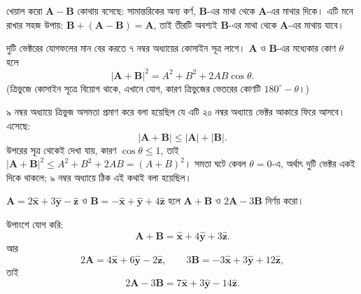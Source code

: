 \documentclass[11pt]{article}
\begin{document}
\begin{center}
\end{center}

খেয়াল করো $\mathbf{A}-\mathbf{B}$ কোথায় বসেছে: সামান্তরিকের অন্য কর্ণ,
$\mathbf{B}$-এর মাথা থেকে $\mathbf{A}$-এর মাথার দিকে। এটি মনে রাখার সহজ উপায়:
$\mathbf{B} + (\mathbf{A}-\mathbf{B}) = \mathbf{A}$, তাই তীরটি অবশ্যই
$\mathbf{B}$-এর মাথা থেকে $\mathbf{A}$-এর মাথায় যাবে।

দুটি ভেক্টরের যোগফলের মান বের করতে ৭ নম্বর অধ্যায়ের কোসাইন সূত্র লাগে।
$\mathbf{A}$ ও $\mathbf{B}$-এর মধ্যেকার কোণ $\theta$ হলে
\[
  |\mathbf{A}+\mathbf{B}|^{2}
  = A^{2} + B^{2} + 2AB\cos\theta .
\]
(ত্রিভুজে কোসাইন সূত্রে বিয়োগ থাকে, এখানে যোগ, কারণ ত্রিভুজের ভেতরের কোণটি
$180^{\circ}-\theta$।)

\begin{remark}
৯ নম্বর অধ্যায়ে ত্রিভুজ অসমতা প্রমাণ করে বলা হয়েছিল যে এটি ২০ নম্বর
অধ্যায়ে ভেক্টর আকারে ফিরে আসবে। এসেছে:
\[
  |\mathbf{A}+\mathbf{B}| \leq |\mathbf{A}| + |\mathbf{B}| .
\]
উপরের সূত্র থেকেই দেখা যায়, কারণ $\cos\theta \leq 1$, তাই
$|\mathbf{A}+\mathbf{B}|^{2} \leq A^{2}+B^{2}+2AB = (A+B)^{2}$। সমতা ঘটে
কেবল $\theta = 0$-এ, অর্থাৎ দুটি ভেক্টর একই দিকে থাকলে; ৯ নম্বর অধ্যায়ে
ঠিক এই কথাই বলা হয়েছিল।
\end{remark}

\begin{example}
$\mathbf{A} = 2\hat{\mathbf{x}}+3\hat{\mathbf{y}}-\hat{\mathbf{z}}$ ও
$\mathbf{B} = -\hat{\mathbf{x}}+\hat{\mathbf{y}}+4\hat{\mathbf{z}}$ হলে
$\mathbf{A}+\mathbf{B}$ ও $2\mathbf{A}-3\mathbf{B}$ নির্ণয় করো।
\end{example}

\begin{solbox}
উপাংশে যোগ করি:
\[
  \mathbf{A}+\mathbf{B} = \hat{\mathbf{x}} + 4\hat{\mathbf{y}}
  + 3\hat{\mathbf{z}} .
\]
আর
\[
  2\mathbf{A} = 4\hat{\mathbf{x}}+6\hat{\mathbf{y}}-2\hat{\mathbf{z}},
  \qquad
  3\mathbf{B} = -3\hat{\mathbf{x}}+3\hat{\mathbf{y}}+12\hat{\mathbf{z}} ,
\]
তাই
\[
  2\mathbf{A}-3\mathbf{B} = 7\hat{\mathbf{x}} + 3\hat{\mathbf{y}}
  - 14\hat{\mathbf{z}} .
\]
\end{solbox}
\end{document}
